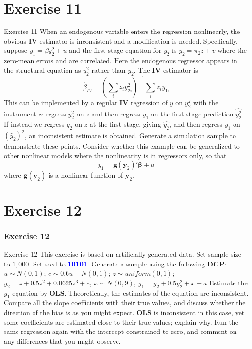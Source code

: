 \documentclass[10pt, aspectratio=169]{beamer}
\begin{document}
	\section{Exercise 11}
		\begin{frame}[t]
			\begin{block}{Exercise 11}
				When an endogenous variable enters the regression nonlinearly, the obvious
				\textbf{IV} estimator is inconsistent and a modification is needed. Specifically,
				suppose $y_{1} = \beta y_{2}^{2} + u $ and the first-stage equation for
				$y_{2}$ is $y_{2} = \pi_{2}z + v $ where the zero-mean errors and are correlated.
				Here the endogenous regressor appears in the structural equation as $y_{2}^{2}$ rather than $y_{2}$.
				The \textbf{IV} estimator is 
					\begin{equation}
						\hat{\beta}_{IV} = \left(\sum_{i}z_{i}y_{2i}^{2} \right)^{-1}\sum_{i}z_{i}y_{1i}
					\end{equation}
				This can be implemented by a regular \textbf{IV} regression of $y$ on $y_{2}^{2}$ with the instrument
				$z$: regress $y_{2}^{2}$ on $z$ and then regress $y_{1}$ on the first-stage prediction $\widehat{y_{2}^{2}}$. 
				If instead we regress $y_{2}$ on $z$
				at the first stage, giving $\hat{y_{2}}$, and then regress $y_{1}$ on $\left(\hat{y}_{2}\right)^{2}$, an inconsistent
				estimate is obtained. Generate a simulation sample to demonstrate these
				points. Consider whether this example can be generalized to other nonlinear
				models where the nonlinearity is in regressors only, so that 
					\begin{equation}
						y_{1} = \mathbf{g}\left(\mathbf{y}_{2}\right)'\mathbf{\beta} + u
					\end{equation}
				where $\mathbf{g}\left(\mathbf{y}_{2}\right)$ is a nonlinear function of $\mathbf{y}_{2}$.
			\end{block}
		\end{frame}
	\section{Exercise 12}
		\begin{frame}
			\frametitle{Exercise 12}
			\begin{block}{Exercise 12}
				This exercise is based on artificially generated data. Set sample size to
				$1,000$. Set seed to \textcolor{blue}{\textbf{10101}}. Generate a sample using the following \textbf{DGP}: 
				$u\sim N(0,1)$; $e \sim 0.6u + N(0,1)$; $z \sim uniform(0,1)$;
				$y_{2} = z + 0.5z^{2} + 0.0625z^{3} + e$; $x \sim N(0,9)$; $y_{1} = y_{2} + 0.5y_{2}^{2} + x + u$
				Estimate the $y_{1}$ equation by \textbf{OLS}. Theoretically, the estimates of the equation
				are inconsistent. Compare all the slope coefficients with their true values,
				and discuss whether the direction of the bias is as you might expect. \textbf{OLS} is
				inconsistent in this case, yet some coefficients are estimated close to their
				true values; explain why. Run the same regression again with the intercept
				constrained to zero, and comment on any differences that you might observe.
			\end{block}
		\end{frame}
\end{document}
